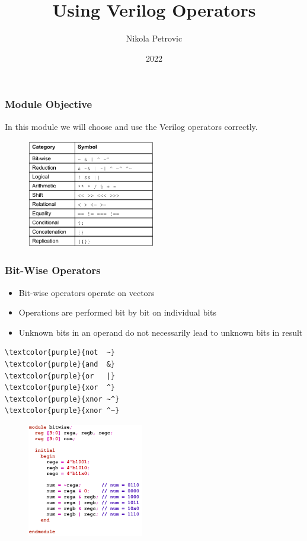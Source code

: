 \documentclass[t, notes, xcolor=table]{beamer}
\title{Using Verilog Operators}
\author{Nikola Petrovic}
\institute{University of Belgrade, School of Electrical Engineering}
\date{2022}
\begin{document}
\frame{\titlepage}

\begin{frame}
\frametitle{Module Objective}

In this module we will choose and use the Verilog operators correctly.

\begin{figure}[H!]
    \includegraphics[width=0.5\textwidth]{img/05_operators.png}
\end{figure}

\end{frame}

\begin{frame}[fragile]
\frametitle{Bit-Wise Operators}
\scriptsize{
\begin{multicols}{2}
\begin{itemize}
\item Bit-wise operators operate on vectors
\item Operations are performed bit by bit on individual bits
\item Unknown bits in an operand do not necessarily lead to unknown bits in result
\end{itemize}
\vfill
\begin{Verbatim}[commandchars=\\\{\}, tabsize=2]
\textcolor{purple}{not  ~}
\textcolor{purple}{and  &}
\textcolor{purple}{or   |}
\textcolor{purple}{xor  ^}
\textcolor{purple}{xnor ~^}
\textcolor{purple}{xnor ^~}
\end{Verbatim}

\columnbreak
\begin{figure}
    \includegraphics[width=0.45\textwidth]{img/05_bitwise.png}
\end{figure}
\end{multicols}
}
\end{frame}
\end{document}

